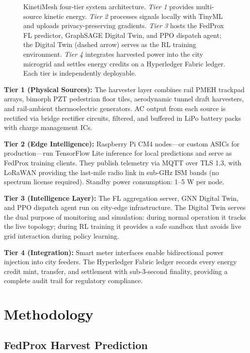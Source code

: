 \documentclass[conference]{IEEEtran}
\begin{document}
\begin{figure}[ht]
\begin{tikzpicture}
\end{tikzpicture}
\caption{%
KinetiMesh four-tier system architecture.
\textit{Tier 1} provides multi-source kinetic energy.
\textit{Tier 2} processes signals locally with TinyML and uploads privacy-preserving gradients.
\textit{Tier 3} hosts the FedProx FL predictor, GraphSAGE Digital Twin, and PPO dispatch agent;
the Digital Twin (dashed arrow) serves as the RL training environment.
\textit{Tier 4} integrates harvested power into the city microgrid and settles energy credits on a Hyperledger Fabric ledger.
Each tier is independently deployable.}
\label{fig:architecture}
\end{figure}

\textbf{Tier 1 (Physical Sources):} The harvester layer combines rail PMEH trackpad arrays, bimorph PZT pedestrian floor tiles, aerodynamic tunnel draft harvesters, and rail-ambient thermoelectric generators. AC output from each source is rectified via bridge rectifier circuits, filtered, and buffered in LiPo battery packs with charge management ICs.

\textbf{Tier 2 (Edge Intelligence):} Raspberry Pi CM4 nodes—or custom ASICs for production—run TensorFlow Lite inference for local predictions and serve as FedProx training clients. They publish telemetry via MQTT over TLS 1.3, with LoRaWAN providing the last-mile radio link in sub-GHz ISM bands (no spectrum license required). Standby power consumption: 1--5 W per node.

\textbf{Tier 3 (Intelligence Layer):} The FL aggregation server, GNN Digital Twin, and PPO dispatch agent run on city-edge infrastructure. The Digital Twin serves the dual purpose of monitoring and simulation: during normal operation it tracks the live topology; during RL training it provides a safe sandbox that avoids live grid interaction during policy learning.

\textbf{Tier 4 (Integration):} Smart meter interfaces enable bidirectional power injection into city feeders. The Hyperledger Fabric ledger records every energy credit mint, transfer, and settlement with sub-3-second finality, providing a complete audit trail for regulatory compliance.

\section{Methodology}

\subsection{FedProx Harvest Prediction}
\end{document}
